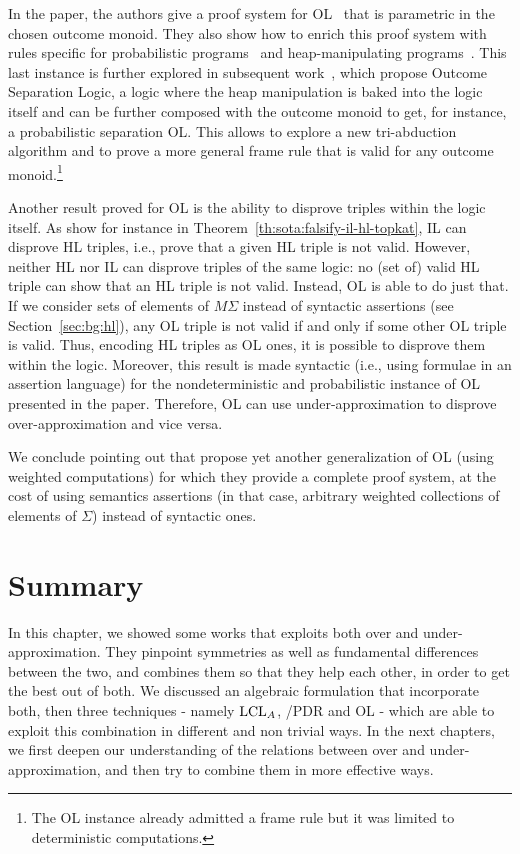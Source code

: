 In the paper, the authors give a proof system for OL~\cite[Figure~4]{ZDS23} that is parametric in the chosen outcome monoid. They also show how to enrich this proof system with rules specific for probabilistic programs~\cite[Figure~7]{ZDS23} and heap-manipulating programs~\cite[Figure~6]{ZDS23}. This last instance is further explored in subsequent work~\cite{ZSS24}, which propose Outcome Separation Logic, a logic where the heap manipulation is baked into the logic itself and can be further composed with the outcome monoid to get, for instance, a probabilistic separation OL. This allows to explore a new tri-abduction algorithm and to prove a more general frame rule that is valid for any outcome monoid.\footnote{The OL instance already admitted a frame rule but it was limited to deterministic computations.}

Another result proved for OL is the ability to disprove triples within the logic itself. As show for instance in Theorem~\ref{th:sota:falsify-il-hl-topkat}, IL can disprove HL triples, i.e., prove that a given HL triple is not valid. However, neither HL nor IL can disprove triples of the same logic: no (set of) valid HL triple can show that an HL triple is not valid. Instead, OL is able to do just that. If we consider sets of elements of $M \Sigma$ instead of syntactic assertions (see Section~\ref{sec:bg:hl}), any OL triple is not valid if and only if some other OL triple is valid. Thus, encoding HL triples as OL ones, it is possible to disprove them within the logic. Moreover, this result is made syntactic (i.e., using formulae in an assertion language) for the nondeterministic and probabilistic instance of OL presented in the paper. Therefore, OL can use under-approximation to disprove over-approximation and vice versa.

We conclude pointing out that \cite{Zilberstein24} propose yet another generalization of OL (using weighted computations) for which they provide a complete proof system, at the cost of using semantics assertions (in that case, arbitrary weighted collections of elements of $\Sigma$) instead of syntactic ones.

\section{Summary}
In this chapter, we showed some works that exploits both over and under-approximation. They pinpoint symmetries as well as fundamental differences between the two, and combines them so that they help each other, in order to get the best out of both. We discussed an algebraic formulation that incorporate both, then three techniques - namely $\text{LCL}_A$, /PDR and OL - which are able to exploit this combination in different and non trivial ways. In the next chapters, we first deepen our understanding of the relations between over and under-approximation, and then try to combine them in more effective ways.
